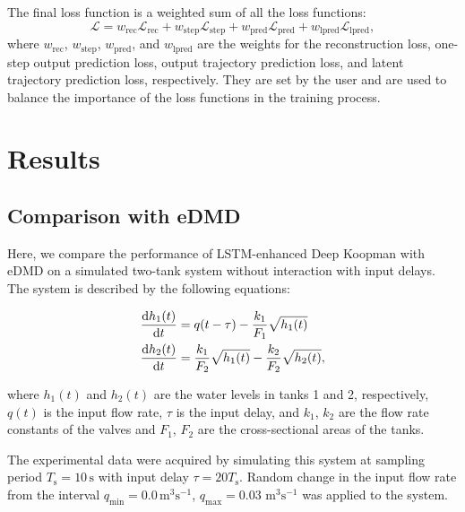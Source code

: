 \documentclass[conference]{IEEEtran}
\newcommand{\ui}[2]{#1_{\text{#2}}}
\begin{document}
The final loss function is a weighted sum of all the loss functions:
\begin{equation}
    \mathcal{L} = \ui{w}{rec}\mathcal{L}_{\text{rec}} + \ui{w}{step}\mathcal{L}_{\text{step}} + \ui{w}{pred}\mathcal{L}_{\text{pred}} + \ui{w}{lpred}\mathcal{L}_{\text{lpred}},
\end{equation}
where \(\ui{w}{rec}\), \(\ui{w}{step}\), \(\ui{w}{pred}\), and \(\ui{w}{lpred}\) are the weights for the reconstruction loss, one-step output prediction loss, output trajectory prediction loss, and latent trajectory prediction loss, respectively. They are set by the user and are used to balance the importance of the loss functions in the training process.


\section{Results}

\subsection{Comparison with eDMD}

Here, we compare the performance of LSTM-enhanced Deep Koopman with eDMD on a simulated two-tank system without interaction with input delays. The system is described by the following equations:

\begin{equation}\label{eq:two_tanks_system}
    \begin{aligned}
 \diff{h_1(t)}{t} & = q(t-\tau) - \frac{k_1}{F_1}\sqrt{h_1(t)}                     \\
 \diff{h_2(t)}{t} & = \frac{k_1}{F_2}\sqrt{h_1(t)} - \frac{k_2}{F_2}\sqrt{h_2(t)},
    \end{aligned}
\end{equation}

where \(h_1(t)\) and \(h_2(t)\) are the water levels in tanks 1 and 2, respectively, \(q(t)\) is the input flow rate, \(\tau \) is the input delay, and \(k_1\), \(k_2\) are the flow rate constants of the valves and \(F_1\), \(F_2\) are the cross-sectional areas of the tanks.

The experimental data were acquired by simulating this system at sampling period \( \ui{T}{s} = 10 \, \mathrm{s} \) with input delay \( \tau = 20\ui{T}{s} \). Random change in the input flow rate from the interval \( \ui{q}{min} = 0.0 \, \text{m}^3\text{s}^{-1} \), \( \ui{q}{max} = 0.03 \) \( \text{m}^3\text{s}^{-1} \) was applied to the system.
\end{document}
